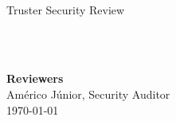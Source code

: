 \begin{titlepage}
  \vbox{}
  \vbox{}

  \begin{center}


    \noindent\makebox[\linewidth]{\rule{.7\paperwidth}{.6pt}}\\[0.7cm]

    { \huge \bfseries

      Truster Security Review
    }\\[0.25cm]
    
    \noindent\makebox[\linewidth]{\rule{.7\paperwidth}{.6pt}}\\[0.7cm]

    
    \vfill


    
    \large
    {\bfseries Reviewers}\\
    
    Américo Júnior, Security Auditor \\

    {\large \today}

  \end{center}

\end{titlepage}